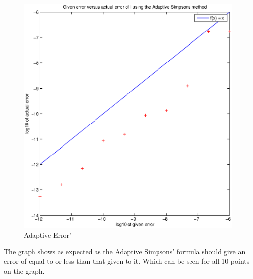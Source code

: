 \documentclass[fleqn]{report}
\begin{document}
\begin{figure}[h!]
\begin{center}
    \centerline{\includegraphics[width=1.4\textwidth]{q8.eps}}
    \caption{Adaptive Error'}
\end{center}
\end{figure}

The graph shows as expected as the Adaptive Simpsons' formula should give an error of equal to
or less than that given to it. Which can be seen for all 10 points on the graph. 
\end{document}
